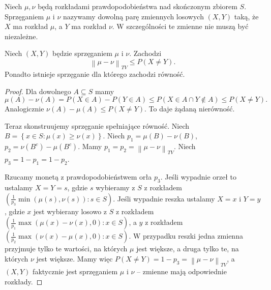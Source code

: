 \begin{definition}
	Niech \(\mu, \nu\) będą rozkładami prawdopodobieństwa nad skończonym zbiorem \(S\). Sprzęganiem \(\mu\) i \(\nu\) nazywamy dowolną parę zmiennych losowych \(\left( X,Y \right) \) taką, że \(X\) ma rozkład \(\mu\), a \(Y\) ma rozkład \(\nu\). W szczególności te zmienne nie muszą być niezależne.
\end{definition}

\begin{lemma}
	Niech \(\left( X,Y \right) \) będzie sprzęganiem \(\mu\) i \(\nu\). Zachodzi
	\[ \left\|\mu-\nu\right\|_{TV} \le P\left( X \neq Y \right) . \]
	Ponadto istnieje sprzęganie dla którego zachodzi równość.
\end{lemma}
\begin{proof}
	Dla dowolnego \(A \subseteq S\) mamy
	\[ \mu\left( A  \right) - \nu\left( A  \right) = P\left( X \in A  \right) - P\left( Y \in  A  \right) \le P\left( X \in A \cap Y \notin A  \right) \le P \left( X \neq Y \right) . \]
	Analogicznie \(\nu\left( A  \right) - \mu\left( A  \right) \le  P\left( X \neq Y \right) \). To daje żądaną nierówność.

	Teraz skonstruujemy sprzęganie spełniające równość. Niech \(B = \left\{ x \in S : \mu\left( x  \right) \ge \nu\left( x  \right)  \right\} \). Niech \(p_1 = \mu\left( B  \right) - \nu\left( B  \right) \), \(p_2 = \nu\left( B^{c} \right) - \mu\left( B^{c} \right) \). Mamy \(p_1 = p_2 = \left\|\mu-\nu\right\|_{TV}\). Niech \(p_3 = 1-p_1 = 1-p_2\).

	Rzucamy monetą z prawdopodobieństwem orła \(p_3\). Jeśli wypadnie orzeł to ustalamy \(X = Y = s \), gdzie \(s\) wybieramy z \(S\) z rozkładem \(\left( \frac{1}{p_3} \min\left( \mu\left( s  \right) ,\nu\left( s  \right)  \right) : s \in S \right) \). Jeśli wypadnie reszka ustalamy \(X = x \) i \(Y=y\), gdzie \(x\) jest wybierany losowo z \(S \) z rozkładem \(\left( \frac{1}{p_1} \max\left( \mu\left( x  \right) -\nu\left( x  \right) , 0 \right) : x \in S \right) \), a \(y\) z rozkładem \(\left( \frac{1}{p_2} \max\left( \nu\left( x  \right) -\mu\left( x  \right) , 0 \right) : x \in S \right) \). W przypadku reszki jedna zmienna przyjmuje tylko te wartości, na których \(\mu\) jest większe, a druga tylko te, na których \(\nu\) jest większe. Mamy więc \(P\left( X\neq Y \right) = 1-p_3 = \left\|\mu-\nu\right\|_{TV}\), a \(\left( X,Y \right) \) faktycznie jest sprzęganiem \(\mu\) i \(\nu\) -- zmienne mają odpowiednie rozkłady.
\end{proof}
